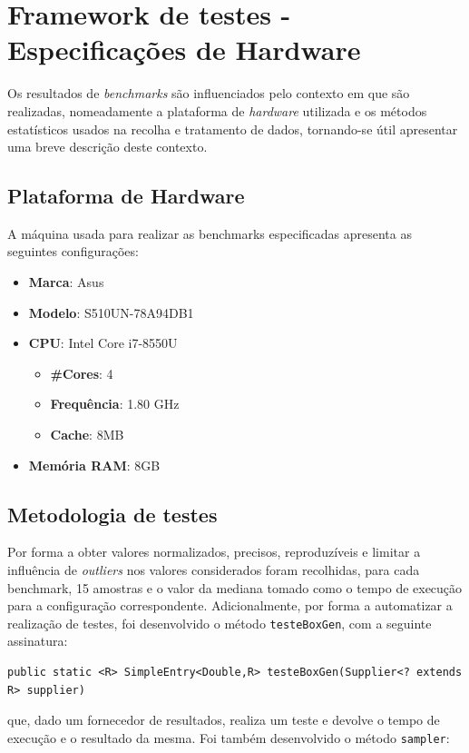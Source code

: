 \documentclass{article}
\begin{document}
\section{Framework de testes - Especificações de Hardware}
Os resultados de \textit{benchmarks} são influenciados pelo contexto em que são realizadas, nomeadamente a plataforma de \textit{hardware} utilizada e os métodos estatísticos 
usados na recolha e tratamento de dados, tornando-se útil apresentar uma breve descrição deste contexto.

\subsection{Plataforma de Hardware}
A máquina usada para realizar as benchmarks especificadas apresenta as seguintes configurações:
\begin{itemize}
    \item \textbf{Marca}: Asus
    \item \textbf{Modelo}: S510UN-78A94DB1
    \item \textbf{CPU}: Intel Core i7-8550U
        \begin{itemize}
            \item \textbf{\#Cores}: 4
            \item \textbf{Frequência}: 1.80 GHz
            \item \textbf{Cache}: 8MB
        \end{itemize}
    \item \textbf{Memória RAM}: 8GB
\end{itemize}

\subsection{Metodologia de testes}
Por forma a obter valores normalizados, precisos, reproduzíveis e limitar a influência de \textit{outliers} nos valores considerados foram
recolhidas, para cada benchmark, 15 amostras e o valor da mediana tomado como o tempo de execução para a configuração correspondente.
Adicionalmente, por forma a automatizar a realização de testes, foi desenvolvido o método \texttt{testeBoxGen}, com a seguinte assinatura:

\begin{lstlisting}
public static <R> SimpleEntry<Double,R> testeBoxGen(Supplier<? extends R> supplier)
\end{lstlisting}

que, dado um fornecedor de resultados, realiza um teste e devolve o tempo de execução e o resultado da mesma. Foi também desenvolvido o método \texttt{sampler}:
\end{document}
